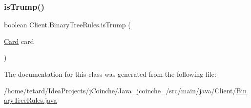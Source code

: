 \mbox{\label{classClient_1_1BinaryTreeRules_a27149c7f4a1039d0baf2d5f19f56b6ce}} 
\subsubsection{\texorpdfstring{is\+Trump()}{isTrump()}}
{\footnotesize\ttfamily boolean Client.\+Binary\+Tree\+Rules.\+is\+Trump (\begin{DoxyParamCaption}\item[{\mbox{\hyperlink{classCommon_1_1Card}{Card}}}]{card }\end{DoxyParamCaption})\hspace{0.3cm}{\ttfamily [inline]}}



The documentation for this class was generated from the following file\+:\begin{DoxyCompactItemize}
\item 
/home/tetard/\+Idea\+Projects/j\+Coinche/\+Java\+\_\+jcoinche\+\_/src/main/java/\+Client/\mbox{\hyperlink{BinaryTreeRules_8java}{Binary\+Tree\+Rules.\+java}}\end{DoxyCompactItemize}
